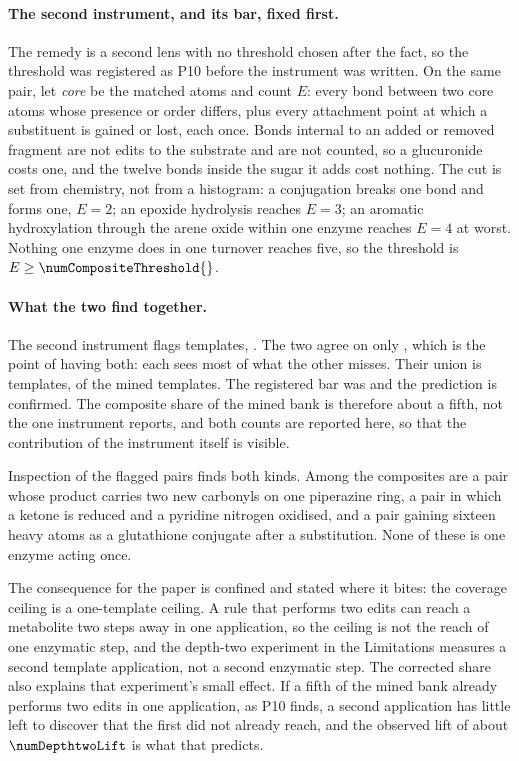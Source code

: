 \documentclass[journal=jcisd8,manuscript=suppinfo,layout=onecolumn]{achemso}
\begin{document}
\paragraph{The second instrument, and its bar, fixed first.} The remedy is a second lens with no
threshold chosen after the fact, so the threshold was registered as P10 before the instrument was
written. On the same pair, let \emph{core} be the matched atoms and count $E$: every bond between
two core atoms whose presence or order differs, plus every attachment point at which a substituent
is gained or lost, each once. Bonds internal to an added or removed fragment are not edits to the
substrate and are not counted, so a glucuronide costs one, and the twelve bonds inside the sugar
it adds cost nothing. The cut is set from
chemistry, not from a histogram: a conjugation breaks one bond and forms one, $E=2$; an
epoxide hydrolysis reaches $E=3$; an aromatic hydroxylation through the arene oxide within one
enzyme reaches $E=4$ at worst. Nothing one enzyme does in one turnover reaches five, so the
threshold is $E \ge \numCompositeThreshold{}$.

\paragraph{What the two find together.} The second instrument flags \numCompositeEdits{}
templates, \numCompositeEditsharePct{}. The two agree on only \numCompositeBoth{}, which is the
point of having both: each sees most of what the other misses. Their union is
\numCompositeUnion{} templates, \numCompositeUnionsharePct{} of the mined templates. The registered
bar
was \numCompositeBarPct{} and the prediction is confirmed. The composite share of the mined bank is
therefore about a fifth, not the \numCompositeLocisharePct{} one instrument reports, and both counts
are reported here, so that the contribution of the instrument itself is visible.

Inspection of the flagged pairs finds both kinds. Among the composites are a pair whose product
carries two new carbonyls on one piperazine ring, a pair in which a ketone is reduced and a
pyridine nitrogen oxidised, and a pair gaining sixteen heavy atoms as a glutathione conjugate
after a substitution. None of these is one enzyme acting once.

The consequence for the paper is confined and stated where it bites: the coverage ceiling is a
one-template ceiling. A rule that performs two edits can reach a metabolite two steps away in one
application, so the ceiling is not the reach of one enzymatic step, and the depth-two experiment
in the Limitations measures a second template application, not a second enzymatic step. The
corrected share also explains that experiment's small effect. If a fifth of the mined bank
already performs two edits in one application, as P10 finds, a second application has little left
to discover that the first did not already reach, and the observed lift of about $\numDepthtwoLift$ is what
that predicts.
\end{document}
